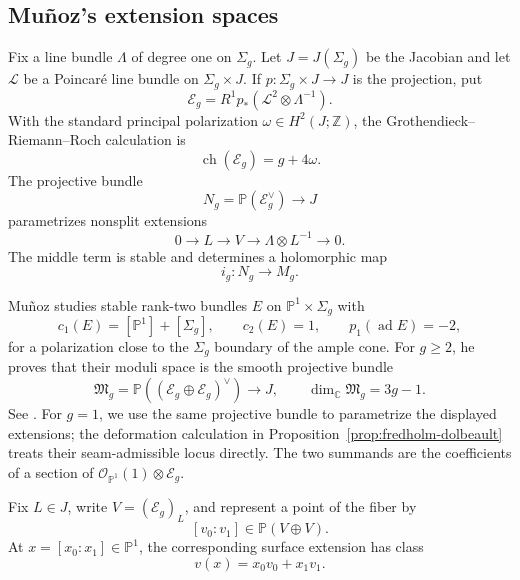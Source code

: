 \documentclass[11pt]{amsart}
\theoremstyle{definition}
\theoremstyle{remark}
\theoremstyle{plain}
\newcommand{\ZZ}{\mathbb{Z}}
\newcommand{\CC}{\mathbb{C}}
\newcommand{\PP}{\mathbb{P}}
\newcommand{\cE}{\mathcal{E}}
\newcommand{\cO}{\mathcal{O}}
\newcommand{\frakM}{\mathfrak{M}}
\newcommand{\ad}{\operatorname{ad}}
\begin{document}
\subsection{Mu\~noz's extension spaces}\label{sec:munoz-spaces}
Fix a line bundle $\Lambda$ of degree one on $\Sigma_g$.  Let
$J=J(\Sigma_g)$ be the Jacobian and let $\mathscr L$ be a Poincar\'e line
bundle on $\Sigma_g\times J$.  If $p:\Sigma_g\times J\to J$ is the
projection, put
\begin{equation}\label{eq:extension-bundle}
             \cE_g=R^1p_*(\mathscr L^2\otimes\Lambda^{-1}).
\end{equation}
With the standard principal polarization $\omega\in H^2(J;\ZZ)$, the
Grothendieck--Riemann--Roch calculation is
\begin{equation}\label{eq:ch-Eg}
                         \operatorname{ch}(\cE_g)=g+4\omega.
\end{equation}
The projective bundle
\[
                         N_g=\PP(\cE_g^\vee)\longrightarrow J
\]
parametrizes nonsplit extensions
\begin{equation}\label{eq:surface-extension}
 0\longrightarrow L\longrightarrow V
 \longrightarrow\Lambda\otimes L^{-1}\longrightarrow0.
\end{equation}
The middle term is stable and determines a holomorphic map
\begin{equation}\label{eq:i-map}
                              i_g:N_g\longrightarrow M_g.
\end{equation}

Mu\~noz studies stable rank-two bundles $E$ on
$\PP^1\times\Sigma_g$ with
\begin{equation}\label{eq:primitive-chern}
 c_1(E)=[\PP^1]+[\Sigma_g],\qquad c_2(E)=1,
 \qquad p_1(\ad E)=-2,
\end{equation}
for a polarization close to the $\Sigma_g$ boundary of the ample cone.
For $g\geq2$, he proves that their moduli space is the smooth projective bundle
\begin{equation}\label{eq:frakM}
 \frakM_g=\PP((\cE_g\oplus\cE_g)^\vee)\longrightarrow J,
 \qquad \dim_\CC\frakM_g=3g-1.
\end{equation}
See \cite[Sections~3--4]{Munoz99b}. For $g=1$, we use the same
projective bundle to parametrize the displayed extensions; the
deformation calculation in Proposition~\ref{prop:fredholm-dolbeault}
treats their seam-admissible locus directly. The two summands are the
coefficients of a section of $\cO_{\PP^1}(1)\otimes\cE_g$.

Fix $L\in J$, write $V=(\cE_g)_L$, and represent a point of the fiber by
\[
                      [v_0:v_1]\in\PP(V\oplus V).
\]
At $x=[x_0:x_1]\in\PP^1$, the corresponding surface extension has class
\begin{equation}\label{eq:extension-pencil}
                         v(x)=x_0v_0+x_1v_1.
\end{equation}
\end{document}
